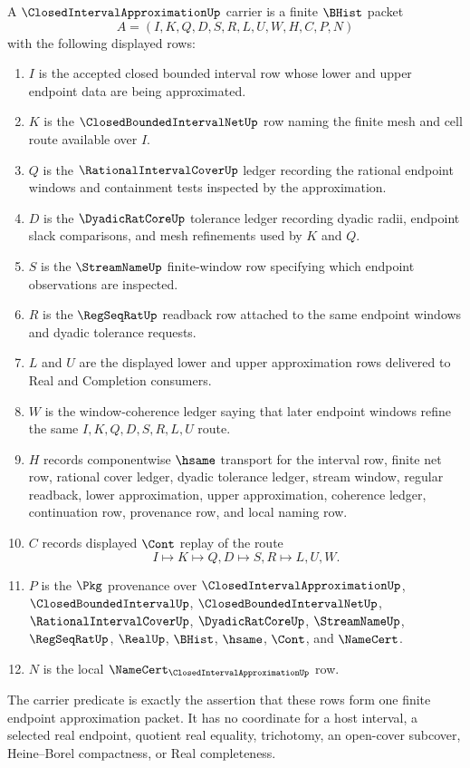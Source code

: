 \begin{definition}
\label{def:closed-interval-approximation-carrier}
A $\ClosedIntervalApproximationUp$ carrier is a finite $\BHist$ packet
$$
A=(I,K,Q,D,S,R,L,U,W,H,C,P,N)
$$
with the following displayed rows:
\begin{enumerate}
\item $I$ is the accepted closed bounded interval row whose lower and upper endpoint data are being approximated.
\item $K$ is the $\ClosedBoundedIntervalNetUp$ row naming the finite mesh and cell route available over $I$.
\item $Q$ is the $\RationalIntervalCoverUp$ ledger recording the rational endpoint windows and containment tests inspected by the approximation.
\item $D$ is the $\DyadicRatCoreUp$ tolerance ledger recording dyadic radii, endpoint slack comparisons, and mesh refinements used by $K$ and $Q$.
\item $S$ is the $\StreamNameUp$ finite-window row specifying which endpoint observations are inspected.
\item $R$ is the $\RegSeqRatUp$ readback row attached to the same endpoint windows and dyadic tolerance requests.
\item $L$ and $U$ are the displayed lower and upper approximation rows delivered to Real and Completion consumers.
\item $W$ is the window-coherence ledger saying that later endpoint windows refine the same $I,K,Q,D,S,R,L,U$ route.
\item $H$ records componentwise $\hsame$ transport for the interval row, finite net row, rational cover ledger, dyadic tolerance ledger, stream window, regular readback, lower approximation, upper approximation, coherence ledger, continuation row, provenance row, and local naming row.
\item $C$ records displayed $\Cont$ replay of the route
$$
I \longmapsto K \longmapsto Q,D \longmapsto S,R \longmapsto L,U,W .
$$
\item $P$ is the $\Pkg$ provenance over $\ClosedIntervalApproximationUp$, $\ClosedBoundedIntervalUp$, $\ClosedBoundedIntervalNetUp$, $\RationalIntervalCoverUp$, $\DyadicRatCoreUp$, $\StreamNameUp$, $\RegSeqRatUp$, $\RealUp$, $\BHist$, $\hsame$, $\Cont$, and $\NameCert$.
\item $N$ is the local $\NameCert_{\ClosedIntervalApproximationUp}$ row.
\end{enumerate}
The carrier predicate is exactly the assertion that these rows form one finite endpoint approximation packet. It has no coordinate for a host interval, a selected real endpoint, quotient real equality, trichotomy, an open-cover subcover, Heine--Borel compactness, or Real completeness.
\end{definition}

